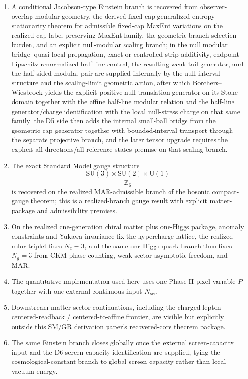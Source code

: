 \documentclass[11pt]{article}
\newcommand{\SU}{\mathrm{SU}}
\newcommand{\U}{\mathrm{U}}
\begin{document}
\begin{enumerate}[leftmargin=2em]
\item A conditional Jacobson-type Einstein branch is recovered from observer-overlap modular geometry, the derived fixed-cap generalized-entropy stationarity theorem for admissible fixed-cap MaxEnt variations on the realized cap-label-preserving MaxEnt family, the geometric-branch selection burden, and an explicit null-modular scaling branch; in the null modular bridge, quasi-local propagation, exact-or-controlled strip additivity, endpoint-Lipschitz renormalized half-line control, the resulting weak tail generator, and the half-sided modular pair are supplied internally by the null-interval structure and the scaling-limit geometric action, after which Borchers--Wiesbrock yields the explicit positive null-translation generator on its Stone domain together with the affine half-line modular relation and the half-line generator/charge identification with the local null-stress charge on that same family; the D5 side then adds the internal small-ball bridge from the geometric cap generator together with bounded-interval transport through the separate projective branch, and the later tensor upgrade requires the explicit all-directions/all-reference-states premise on that scaling branch.
\item The exact Standard Model gauge structure
\[
\frac{\SU(3)\times\SU(2)\times\U(1)}{\mathbb Z_6}
\]
is recovered on the realized MAR-admissible branch of the bosonic compact-gauge theorem; this is a realized-branch gauge result with explicit matter-package and admissibility premises.
\item On the realized one-generation chiral matter plus one-Higgs package, anomaly constraints and Yukawa invariance fix the hypercharge lattice, the realized color triplet fixes \(N_c=3\), and the same one-Higgs quark branch then fixes \(N_g=3\) from CKM phase counting, weak-sector asymptotic freedom, and MAR.
\item The quantitative implementation used here uses one Phase-II pixel variable \(P\) together with one external continuous input \(N_{\mathrm{scr}}\).
\item Downstream matter-sector continuations, including the charged-lepton centered-readback / centered-to-affine frontier, are visible but explicitly outside this SM/GR derivation paper's recovered-core theorem package.
\item The same Einstein branch closes globally once the external screen-capacity input and the D6 screen-capacity identification are supplied, tying the cosmological-constant branch to global screen capacity rather than local vacuum energy.

\end{enumerate}
\end{document}
